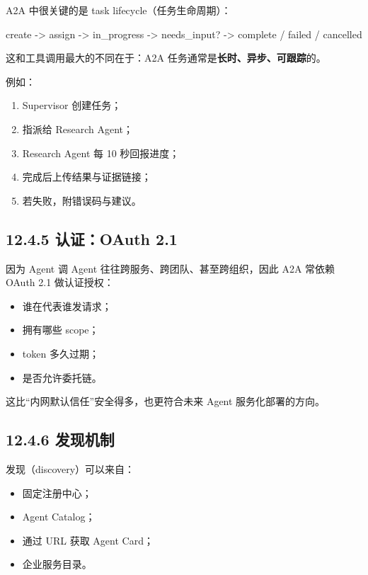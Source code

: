 A2A 中很关键的是 task lifecycle（任务生命周期）：


\begin{codeblock}
create -> assign -> in_progress -> needs_input? -> complete / failed / cancelled
\end{codeblock}

这和工具调用最大的不同在于：A2A 任务通常是\textbf{长时、异步、可跟踪}的。


例如：


\begin{enumerate}[leftmargin=2em]
\item Supervisor 创建任务；
\item 指派给 Research Agent；
\item Research Agent 每 10 秒回报进度；
\item 完成后上传结果与证据链接；
\item 若失败，附错误码与建议。
\end{enumerate}

\subsection{12.4.5 认证：OAuth 2.1}

因为 Agent 调 Agent 往往跨服务、跨团队、甚至跨组织，因此 A2A 常依赖 OAuth 2.1 做认证授权：


\begin{itemize}[leftmargin=2em]
\item 谁在代表谁发请求；
\item 拥有哪些 scope；
\item token 多久过期；
\item 是否允许委托链。
\end{itemize}

这比``内网默认信任''安全得多，也更符合未来 Agent 服务化部署的方向。


\subsection{12.4.6 发现机制}

发现（discovery）可以来自：


\begin{itemize}[leftmargin=2em]
\item 固定注册中心；
\item Agent Catalog；
\item 通过 URL 获取 Agent Card；
\item 企业服务目录。
\end{itemize}

